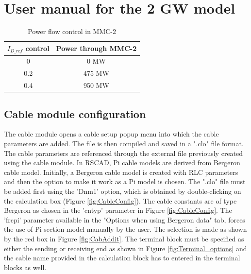 \chapter{User manual for the 2 GW model}

 \begin{table}[H]
 \centering
\begin{tabular}{|c|c|}
\hline
\textbf{$I_{D\_ref}$ control} & \textbf{Power through MMC-2} \\ \hline
0                    & 0 MW                         \\ \hline
0.2                  & 475 MW                       \\ \hline
0.4                  & 950 MW                       \\ \hline
\end{tabular}
\caption{Power flow control in MMC-2}
\label{tab:Power_flow_control_in_MMC-2}
\end{table}

\section{Cable module configuration}\label{config_cable}
The cable module opens a cable setup popup menu into which the cable parameters are added. The file is then compiled and saved in a ".clo" file format. The cable parameters are referenced through the external file previously created using the cable module. In RSCAD, Pi cable models are derived from Bergeron cable model. Initially, a Bergeron cable model is created with RLC parameters and then the option to make it work as a Pi model is chosen. The ".clo" file must be added first using the 'Dnm1' option, which is obtained by double-clicking on the calculation box (Figure \ref{fig:CableConfig}). The cable constants are of type Bergeron as chosen in the 'cntyp' parameter in Figure \ref{fig:CableConfig}. The 'frcpi' parameter available in the "Options when using Bergeron data" tab, forces the use of Pi section model manually by the user. The selection is made as shown by the red box in Figure \ref{fig:CabAddit}. The terminal block must be specified as either the sending or receiving end as shown in Figure \ref{fig:Terminal_options} and the cable name provided in the calculation block has to entered in the terminal blocks as well.\\

